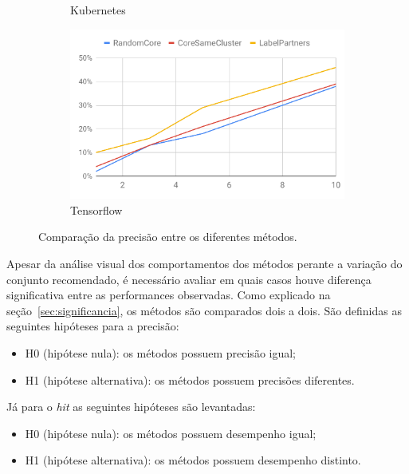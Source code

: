 \documentclass[12pt,openany,oneside,a4paper,english,brazil]{abntbibufjf}
\begin{document}
\begin{figure}[htbp]
\begin{subfigure}[b]{0.475\textwidth}
         \caption[Kubernetes]%
         {{\small Kubernetes}}
         \label{fig:perf-hit-kubernetes}
     \end{subfigure}
     \quad
     \begin{subfigure}[b]{0.475\textwidth}
         \centering
         \includegraphics[width=\textwidth]{resultados/perf-hit-tensorflow}
         \caption[Tensorflow]%
         {{\small Tensorflow}}
         \label{fig:perf-hit-tensorflow}
     \end{subfigure}
     \caption[]
     {\small Comparação da precisão entre os diferentes métodos.}
     \label{fig:perf-hit}
 \end{figure}

 Apesar da análise visual dos comportamentos dos métodos perante a variação do conjunto recomendado, é necessário avaliar em quais casos houve diferença significativa entre as performances observadas. Como explicado na seção~\ref{sec:significancia}, os métodos são comparados dois a dois. São definidas as seguintes hipóteses para a precisão:

 \begin{itemize}
   \item H0 (hipótese nula): os métodos possuem precisão igual;
   \item H1 (hipótese alternativa): os métodos possuem precisões diferentes.
 \end{itemize}

 Já para o \textit{hit} as seguintes hipóteses são levantadas:

  \begin{itemize}
    \item H0 (hipótese nula): os métodos possuem desempenho igual;
    \item H1 (hipótese alternativa): os métodos possuem desempenho distinto.
  \end{itemize}
\end{document}
